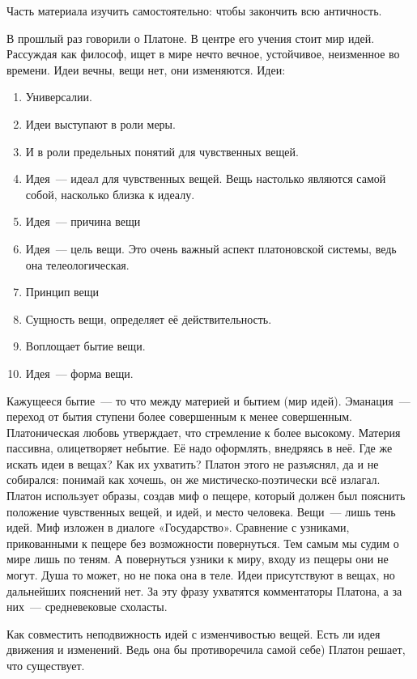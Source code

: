 
Часть материала изучить самостоятельно: чтобы закончить всю античность. 

В прошлый раз говорили о Платоне. В центре его учения стоит мир идей. Рассуждая как философ, ищет в мире нечто вечное, устойчивое, неизменное во времени. 
Идеи вечны, вещи нет, они изменяются. 
Идеи:

\begin{enumerate}
	\item Универсалии. 
	\item Идеи выступают в роли меры. 
	\item И в роли предельных понятий для чувственных вещей. 
	\item Идея~--- идеал для чувственных вещей. Вещь настолько являются самой собой, насколько близка к идеалу. 
	\item Идея~--- причина вещи
	\item Идея~--- цель вещи. Это очень важный аспект платоновской системы, ведь она телеологическая. 
	\item Принцип вещи
	\item Сущность вещи, определяет её действительность. 
	\item Воплощает бытие вещи. 
	\item Идея~--- форма вещи. 
\end{enumerate}

Кажущееся бытие~--- то что между материей и бытием (мир идей). 
Эманация~--- переход от бытия ступени более совершенным к менее совершенным. 
Платоническая любовь утверждает, что стремление к более высокому. 
Материя пассивна, олицетворяет небытие. Её надо оформлять, внедряясь в неё. 
Где же искать идеи в вещах? Как их ухватить?
Платон этого не разъяснял, да и не собирался: понимай как хочешь, он же мистическо-поэтически всё излагал. Платон использует образы, создав миф о пещере, который должен был пояснить положение чувственных вещей, и идей, и место человека. 
Вещи~--- лишь тень идей. Миф изложен в диалоге «Государство». Сравнение с узниками, прикованными к пещере без возможности повернуться. Тем самым мы судим о мире лишь по теням. 
А повернуться узники к миру, входу из пещеры они не могут. Душа то может, но не пока она в теле. 
Идеи присутствуют в вещах, но дальнейших пояснений нет. За эту фразу ухватятся комментаторы Платона, а за них~--- средневековые схоласты. 

Как совместить неподвижность идей с изменчивостью вещей. Есть ли идея движения и изменений. Ведь она бы противоречила самой себе) Платон решает, что существует. 

